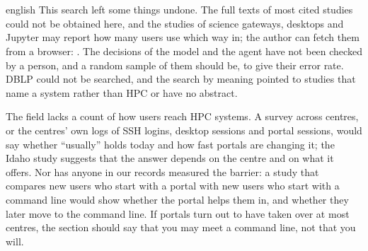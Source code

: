 \section{} %

\begin{onlyin}{english} %
This search left some things undone.  The full texts of most cited
studies could not be obtained here, and the studies of science gateways,
desktops and Jupyter may report how many users use which way in; the
author can fetch them from a browser:
\textcite{Chalker2021OnDemand,Lawrence2015Gateways,Paine2020Jupyter,%
Thota2019Desktops,Sampedro2017Sandstone,Nakao2023Fugaku}.  The decisions
of the model and the agent have not been checked by a person, and a
random sample of them should be, to give their error rate.  DBLP could
not be searched, and the search by meaning pointed to studies that name a
system rather than HPC or have no abstract.

The field lacks a count of how users reach HPC systems.  A survey across
centres, or the centres' own logs of SSH logins, desktop sessions and
portal sessions, would say whether \enquote{usually} holds today and how
fast portals are changing it; the Idaho study suggests that the answer
depends on the centre and on what it offers.  Nor has anyone in our
records measured the barrier: a study that compares new users who start
with a portal with new users who start with a command line would show
whether the portal helps them in, and whether they later move to the
command line.  If portals turn out to have taken over at most centres,
the section should say that you may meet a command line, not that you
will.
\end{onlyin}
